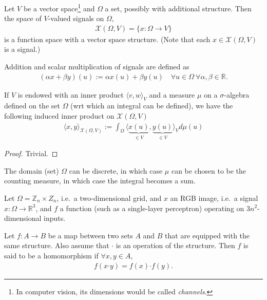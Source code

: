 \begin{defn} 
	Let $V$ be a vector space\footnote{In computer vision, its dimensions would be called \textit{channels}.} and $\Omega$ a set, possibly with additional structure. Then the space of $V$-valued signals on $\Omega$,
	\begin{align}
		\mathcal X(\Omega, V) = \{ x: \Omega \rightarrow V \}
	\end{align}
	is a function space with a vector space structure. (Note that each $x\in \mathcal X(\Omega, V)$ is a signal.)
	
	Addition and scalar multiplication of signals are defined as 
	\begin{align}
		(\alpha x + \beta y)(u) := \alpha x(u) + \beta y(u) \quad \forall u\in\Omega\ \forall \alpha, \beta\in \mathbb R.
	\end{align}
\end{defn}

\begin{lemma}
	If $V$ is endowed with an inner product $\langle v, w\rangle_{V}$ and a measure $\mu$ on a $\sigma$-algebra defined on the set $\Omega$ (wrt which an integral can be defined), we have the following induced inner product on $\mathcal X(\Omega, V)$
	\begin{align}
		\langle x, y\rangle_{\mathcal X(\Omega, V)} := \int_{\Omega}\langle \underbrace{x(u)}_{\in V}, \underbrace{y(u)}_{\in V}\rangle_{V}d\mu(u)
	\end{align}
\end{lemma}

\begin{proof}
	Trivial.
\end{proof}

\begin{remark}
	The domain (set) $\Omega$ can be discrete, in which case $\mu$ can be chosen to be the counting measure, in which case the integral becomes a sum.
\end{remark}

\begin{exmp}
	Let $\Omega = \mathbb Z_{n}\times Z_{n}$, i.e.~a two-dimensional grid, and $x$ an RGB image, i.e.~a signal $x:\Omega\rightarrow \mathbb R^3$, and $f$ a function (such as a single-layer perceptron) operating on $3n^2$-dimensional inputs.
\end{exmp}

\begin{defn}[Homomorphism]
	Let $f:A\rightarrow B$ be a map between two sets $A$ and $B$ that are equipped with the same structure. Also assume that $\bm{\cdot}$ is an operation of the structure. Then $f$ is said to be a homomorphism if $\forall x, y\in A$,
	\begin{align}
		f(x\bm{\cdot} y) = f(x) \bm{\cdot} f(y).
	\end{align}
\end{defn}

